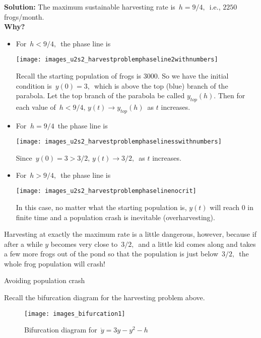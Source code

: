 \textbf{\color{blue}Solution:}
The maximum sustainable harvesting rate is $\, h = 9/4,\,$ i.e., $2250$ frogs/month. \\
\textbf{Why?}
\begin{itemize}
\item For $\, h < 9/4,\,$ the phase line is
  
  \texttt{[image: images\_u2s2\_harvestproblemphaseline2withnumbers]}

  Recall the starting population of frogs is $3000$. So we have the initial condition is
  $\, y(0) = 3,\,$ which is above the top (blue) branch of the parabola.
  Let the top branch of the parabola be called $y_{top} (h)$.
  Then for each value of $\, h < 9/4,\, y(t) \to y_{top}(h)\,$ as $t$ increases.
\item For $\ h = 9/4 \,$ the phase line is

  \texttt{[image: images\_u2s2\_harvestproblemphaselinesswithnumbers]}

  Since $\, y(0) = 3 > 3/2,\,  y(t) \to 3/2,\,$ as $t$ increases.
\item For $\, h > 9/4,\,$ the phase line is

  \texttt{[image: images\_u2s2\_harvestproblemphaselinenocrit]}

  In this case, no matter what the starting population is,
  $y(t)$ will reach $0$ in finite time and a population crash is inevitable (overharvesting).    
\end{itemize}

\begin{remark}
  Harvesting at exactly the maximum rate is a little dangerous,
  however, because if after a while $y$ becomes very close to $\,3/2,\,$
  and a little kid comes along and takes a few more frogs out of the pond
  so that the population is just below $\, 3/2,\,$ the whole frog population will crash!
\end{remark}

\begin{exercise}
  Avoiding population crash
\end{exercise}

Recall the bifurcation diagram for the harvesting problem above.

\begin{figure}[ht!]
  \centering
  \texttt{[image: images\_bifurcation1]}
  \caption{Bifurcation diagram for $\, \dot y = 3y - y^2 - h\,$}
\end{figure}

